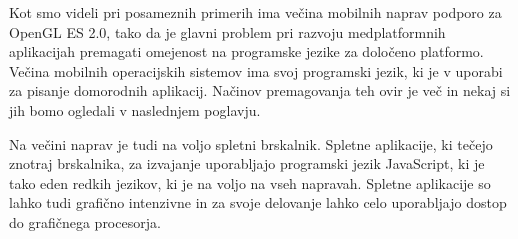 Kot smo videli pri posameznih primerih ima večina mobilnih naprav podporo za OpenGL ES 2.0, tako da je glavni problem pri razvoju medplatformnih aplikacijah premagati omejenost na programske jezike za določeno platformo. Večina mobilnih operacijskih sistemov ima svoj programski jezik, ki je v uporabi za pisanje domorodnih aplikacij. Načinov premagovanja teh ovir je več in nekaj si jih bomo ogledali v naslednjem poglavju. 

Na večini naprav je tudi na voljo spletni brskalnik. Spletne aplikacije, ki tečejo znotraj brskalnika, za izvajanje uporabljajo programski jezik JavaScript, ki je tako eden redkih jezikov, ki je na voljo na vseh napravah. Spletne aplikacije so lahko tudi grafično intenzivne in za svoje delovanje lahko celo uporabljajo dostop do grafičnega procesorja.
